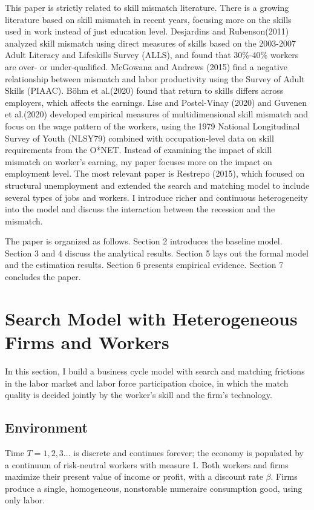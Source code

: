 \documentclass[12pt]{article}
\newcommand{\1}{\mathbb{1}}
\begin{document}
This paper is strictly related to skill mismatch literature. There is a growing literature based on skill mismatch in recent years, focusing more on the skills used in work instead of just education level. Desjardins and Rubenson(2011)\nocite{DesjardinsRubenson2011} analyzed skill mismatch using direct measures of skills based on the 2003-2007 Adult Literacy and Lifeskills Survey (ALLS), and found that 30\%-40\% workers are over- or under-qualified. McGowana and Andrews (2015)\nocite{McGowanAndrews2015} find a negative relationship between mismatch and labor productivity using the Survey of Adult Skills (PIAAC). B{\"o}hm et al.(2020)\nocite{Bohmetal2020} found that return to skills differs across employers, which affects the earnings. 
Lise and Postel-Vinay (2020)\nocite{LisePV2020} and Guvenen et al.(2020)\nocite{Guvenenetal2020} developed empirical measures of multidimensional skill mismatch and focus on the wage pattern of the workers, using the 1979 National Longitudinal Survey of Youth (NLSY79) combined with occupation-level data on skill requirements from the O*NET. Instead of examining the impact of skill mismatch on worker's earning, my paper focuses more on the impact on employment level.  
The most relevant paper is Restrepo (2015)\nocite{Restrepo2015}, which focused on structural unemployment and extended the search and matching model to include several types of jobs and workers. I introduce richer and continuous heterogeneity into the model and discuss the interaction between the recession and the mismatch. 

The paper is organized as follows. Section 2 introduces the baseline model. Section 3 and 4 discuss the analytical results. Section 5 lays out the formal model and the estimation results. Section 6 presents empirical evidence. Section 7 concludes the paper. 

\section{Search Model with Heterogeneous Firms and Workers}
In this section, I build a business cycle model with search and matching frictions in the labor market and labor force participation choice, in which the match quality is decided jointly by the worker's skill and the firm's technology. 

\subsection{Environment}
Time $T = 1, 2, 3 \dots$ is discrete and continues forever; the economy is populated by a continuum of risk-neutral workers with measure 1. Both workers and firms maximize their present value of income or profit, with a discount rate $\beta$. Firms produce a single, homogeneous, nonstorable numeraire consumption good, using only labor. 
\end{document}
